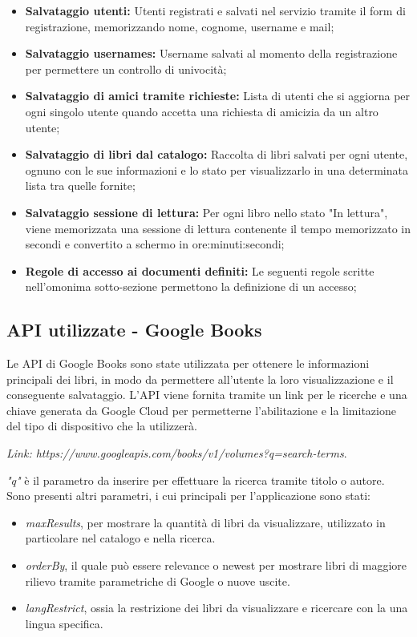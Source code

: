 \documentclass{article}
\begin{document}
\begin{itemize}
  \begin{itemize}
    \item \textbf{Salvataggio utenti:} Utenti registrati e salvati nel servizio tramite il form di registrazione, memorizzando nome, cognome, username e mail;
    \item \textbf{Salvataggio usernames:} Username salvati al momento della registrazione per permettere un controllo di univocità;
    \item \textbf{Salvataggio di amici tramite richieste:} Lista di utenti che si aggiorna per ogni singolo utente quando accetta una richiesta di amicizia da un altro utente;
    \item \textbf{Salvataggio di libri dal catalogo:} Raccolta di libri salvati per ogni utente, ognuno con le sue informazioni e lo stato per visualizzarlo in una determinata lista tra quelle fornite;
    \item \textbf{Salvataggio sessione di lettura:} Per ogni libro nello stato "In lettura", viene memorizzata una sessione di lettura contenente il tempo memorizzato in secondi e convertito a schermo in ore:minuti:secondi;
    \item \textbf{Regole di accesso ai documenti definiti:} Le seguenti regole scritte nell'omonima sotto-sezione permettono la definizione di un accesso; 
  \end{itemize} 
\end{itemize}



\subsection{API utilizzate - Google Books}
Le API di Google Books sono state utilizzata per ottenere le informazioni principali dei libri, in modo da permettere
all'utente la loro visualizzazione e il conseguente salvataggio. L'API viene fornita tramite un link 
per le ricerche e una chiave generata da Google Cloud per permetterne l'abilitazione e la limitazione del tipo di dispositivo che la utilizzerà.

\textit{Link:  https://www.googleapis.com/books/v1/volumes?q=search-terms}.

\textit{"q"} è il parametro da inserire per effettuare la ricerca tramite titolo o autore. Sono presenti altri parametri, i cui principali per l'applicazione sono stati:
\begin{itemize}
  \item \textit{maxResults}, per mostrare la quantità di libri da visualizzare, utilizzato in particolare nel catalogo e nella ricerca.
  \item \textit{orderBy}, il quale può essere relevance o newest per mostrare libri di maggiore rilievo tramite parametriche di Google o nuove uscite.
  \item \textit{langRestrict}, ossia la restrizione dei libri da visualizzare e ricercare con la una lingua specifica.
\end{itemize}
\end{document}
